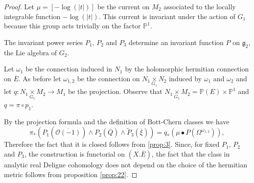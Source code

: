 \documentclass[10pt,twoside]{article}
\numberwithin{equation}{section}
\theoremstyle{plain}
\theoremstyle{definition}
\begin{document}
\begin{proof}
  Let $\mu=[-\log(|t|)]$ be the current on $M_{2}$ associated to the
  locally integrable function $-\log(|t|)$. 
  This current is invariant under the action  of $G_{1}$ because this
  group acts trivially on the factor $\mathbb{P}^{1}$.

  The invariant power series $P_{1}$, $P_{2}$ and $P_{3}$ determine an
  invariant function $P$ on $\mathfrak{g}_{2}$, the Lie algebra of
  $G_{2}$. 

  Let $\omega _{1}$ be the connection induced in $N_{1}$ by the
  holomorphic hermitian 
  connection on $\overline E$. As before let $\omega _{1,2}$ be the connection
  on $N_{1}\underset{G_{1}}{\times} N_{2}$ induced by $\omega _{1}$
  and $\omega _{2}$ and let
  $q\colon N_{1}\underset{G_{1}}{\times} M_{2}\longrightarrow
  M_{1}$ be the projection.
  Observe that $N_{1}\underset{G_{1}}{\times}
  M_{2}=\mathbb{P}(E)\times \mathbb{P}^{1}$ and $q=\pi\circ p_{1}$.

  By the projection formula and the definition of
  Bott-Chern classes we have
  \begin{displaymath}
    \pi_{\ast}(P_{1}(\overline {\mathcal{O}(-1)})\land
    P_{2}(\overline Q)\land
    \widetilde {P}_{3}(\overline {\xi}))=
    q_{\ast}(\mu \bullet P(\Omega
    ^{\omega _{1,2}})),
  \end{displaymath}
  Therefore the fact that it is closed follows from
  \ref{prop:3}. Since, for fixed $P_{1}$, $P_{2}$ and $P_{3}$, the
  construction is functorial on $(X.\overline E)$, the fact that
  the class in analytic real Deligne 
  cohomology does not depend on the choice of the hermitian metric
  follows from proposition \ref{prop:22}. 
\end{proof}    
\end{document}
